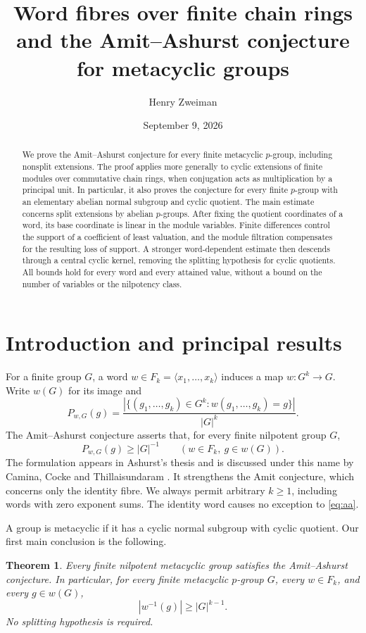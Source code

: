 \documentclass[11pt]{article}
\title{Word fibres over finite chain rings\\and the Amit--Ashurst conjecture for metacyclic groups}
\author{Henry Zweiman}
\date{September 9, 2026}
\newtheorem{theorem}{Theorem}[section]
\theoremstyle{remark}\newtheorem{remark}[theorem]{Remark}
\begin{document}
\maketitle
\begin{abstract}
We prove the Amit--Ashurst conjecture for every finite metacyclic $p$-group, including nonsplit extensions. The proof applies more generally to cyclic extensions of finite modules over commutative chain rings, when conjugation acts as multiplication by a principal unit. In particular, it also proves the conjecture for every finite $p$-group with an elementary abelian normal subgroup and cyclic quotient. The main estimate concerns split extensions by abelian $p$-groups. After fixing the quotient coordinates of a word, its base coordinate is linear in the module variables. Finite differences control the support of a coefficient of least valuation, and the module filtration compensates for the resulting loss of support. A stronger word-dependent estimate then descends through a central cyclic kernel, removing the splitting hypothesis for cyclic quotients. All bounds hold for every word and every attained value, without a bound on the number of variables or the nilpotency class.
\end{abstract}

\section{Introduction and principal results}
For a finite group $G$, a word $w\in F_k=\langle x_1,\ldots,x_k\rangle$ induces a map $w:G^k\to G$. Write $w(G)$ for its image and
\[
 P_{w,G}(g)=\frac{|\{(g_1,\ldots,g_k)\in G^k:w(g_1,\ldots,g_k)=g\}|}{|G|^k}.
\]
The Amit--Ashurst conjecture asserts that, for every finite nilpotent group $G$,
\begin{equation}\label{eq:aa}
 P_{w,G}(g)\ge |G|^{-1}\qquad(w\in F_k,\ g\in w(G)).
\end{equation}
The formulation appears in Ashurst's thesis \cite[Conjecture 6.2.1]{A} and is discussed under this name by Camina, Cocke and Thillaisundaram \cite{CCT}. It strengthens the Amit conjecture, which concerns only the identity fibre. We always permit arbitrary $k\ge1$, including words with zero exponent sums. The identity word causes no exception to \eqref{eq:aa}.

A group is metacyclic if it has a cyclic normal subgroup with cyclic quotient. Our first main conclusion is the following.
\begin{theorem}\label{thm:metacyclic}
Every finite nilpotent metacyclic group satisfies the Amit--Ashurst conjecture. In particular, for every finite metacyclic $p$-group $G$, every $w\in F_k$, and every $g\in w(G)$,
\[
 |w^{-1}(g)|\ge |G|^{k-1}.
\]
No splitting hypothesis is required.
\end{theorem}
\end{document}
